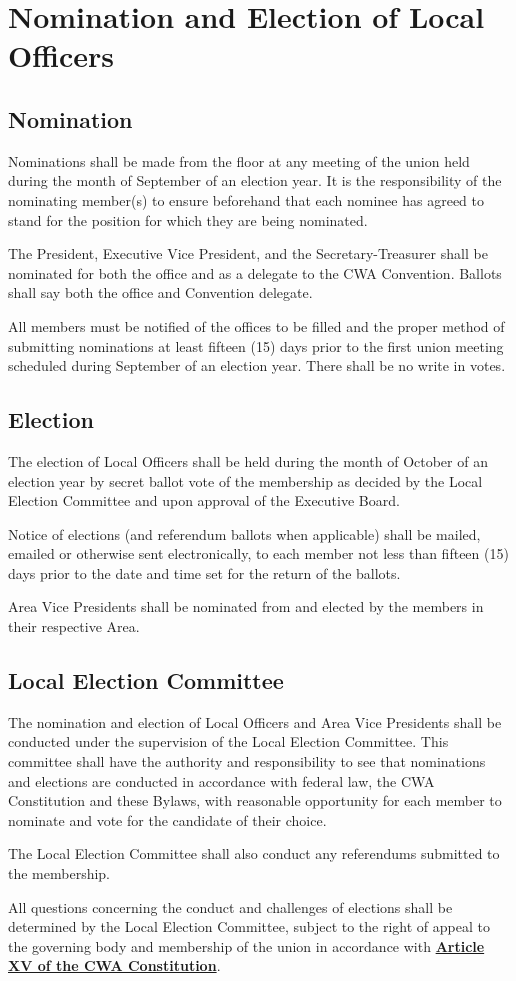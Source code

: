\documentclass[11pt]{article}
\let\oldhref\href
\renewcommand{\href}[2]{\oldhref{#1}{\bfseries#2}}
\newcommand{\article}[1]{\vspace{.50cm}\section{#1}}
\newcommand{\articlesection}[1]{\vspace{.25cm}\subsection{#1}}
\begin{document}
\article{Nomination and Election of Local Officers}
\articlesection{Nomination}
\begin{paralist}
  \item Nominations shall be made from the floor at any meeting of the union held during the month of September of an election year. It is the responsibility of the nominating member(s) to ensure beforehand that each nominee has agreed to stand for the position for which they are being nominated.
  \item The President, Executive Vice President, and the Secretary-Treasurer shall be nominated for both the office and as a delegate to the CWA Convention. Ballots shall say both the office and Convention delegate.
  \item All members must be notified of the offices to be filled and the proper method of submitting nominations at least fifteen (15) days prior to the first union meeting scheduled during September of an election year. There shall be no write in votes.
\end{paralist}

\articlesection{Election}
\begin{paralist}
  \item The election of Local Officers shall be held during the month of October of an election year by secret ballot vote of the membership as decided by the Local Election Committee and upon approval of the Executive Board.
  \item Notice of elections (and referendum ballots when applicable) shall be mailed, emailed or otherwise sent electronically, to each member not less than fifteen (15) days prior to the date and time set for the return of the ballots.
  \item Area Vice Presidents shall be nominated from and elected by the members in their respective Area.
\end{paralist}

\articlesection{Local Election Committee}
\begin{paralist}
  \item The nomination and election of Local Officers and Area Vice Presidents shall be conducted under the supervision of the Local Election Committee. This committee shall have the authority and responsibility to see that nominations and elections are conducted in accordance with federal law, the CWA Constitution and these Bylaws, with reasonable opportunity for each member to nominate and vote for the candidate of their choice.
  \item The Local Election Committee shall also conduct any referendums submitted to the membership.
  \item All questions concerning the conduct and challenges of elections shall be determined by the Local Election Committee, subject to the right of appeal to the governing body and membership of the union in accordance with \href{https://cwa-union.org/for-locals/cwa-constitution\#A15}{Article XV of the CWA Constitution}.
\end{paralist}
\end{document}

